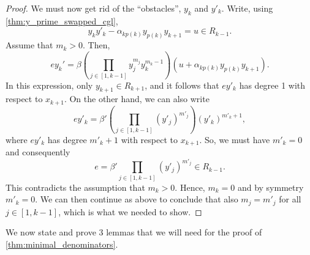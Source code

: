 \begin{proof}
	We must now get rid of the ``obstacles'', $y_k$ and $y'_k$. Write, using
	\cref{thm:y_prime_swapped_cgl},
	\begin{equation*}
		y_k y'_k - \alpha_{kp(k)}y_{p(k)}y_{k+1} = u \in R_{k-1}.
	\end{equation*}
	Assume that $m_k > 0$. Then,
	\begin{equation*}
		e y_k' = \beta \left(\prod_{j \in [1, k-1]}y_j^{m_j}y_k^{m_k-1}\right)(u+\alpha_{kp(k)}y_{p(k)}y_{k+1}).
	\end{equation*}
	In this expression, only $y_{k+1} \in R_{k+1}$, and it follows that $ey'_k$ has degree
	1 with respect to $x_{k+1}$. On the other hand, we can also write
	\begin{equation*}
		ey'_k = \beta'\left(\prod_{j \in [1, k-1]}(y'_j)^{m'_j}\right)(y'_k)^{m'_k + 1},
	\end{equation*}
	where $ey'_k$ has degree $m'_k + 1$ with respect to $x_{k+1}$. So, we must have $m'_k = 0$ and consequently
	\begin{equation*}
		e = \beta' \prod_{j\in [1, k-1]}(y'_j)^{m'_j} \in R_{k-1}.
	\end{equation*}
	This contradicts the assumption that $m_k > 0$. Hence, $m_k = 0$ and by symmetry $m'_k = 0$. We can then continue as above to conclude that also $m_j = m'_j$ for all $j \in [1, k-1]$, which is what we needed to show.
\end{proof}

We now state and prove 3 lemmas that we will need for the proof of
\cref{thm:minimal_denominators}.

